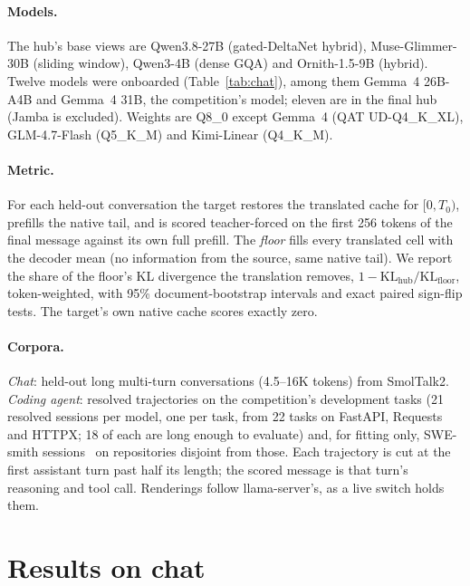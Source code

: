 \documentclass[11pt]{article}
\begin{document}
\paragraph{Models.} The hub's base views are Qwen3.8-27B (gated-DeltaNet hybrid), Muse-Glimmer-30B
(sliding window), Qwen3-4B (dense GQA) and Ornith-1.5-9B (hybrid). Twelve models were onboarded
(Table~\ref{tab:chat}), among them Gemma~4 26B-A4B and Gemma~4 31B, the competition's model; eleven are
in the final hub (Jamba is excluded). Weights are Q8\_0 except Gemma~4 (QAT UD-Q4\_K\_XL), GLM-4.7-Flash
(Q5\_K\_M) and Kimi-Linear (Q4\_K\_M).

\paragraph{Metric.} For each held-out conversation the target restores the translated cache for
$[0,T_0)$, prefills the native tail, and is scored teacher-forced on the first 256 tokens of the
final message against its own full prefill. The \emph{floor} fills every translated cell with the
decoder mean (no information from the source, same native tail). We report the share of the
floor's KL divergence the translation removes, $1 - \mathrm{KL}_{\text{hub}}/\mathrm{KL}_{\text{floor}}$,
token-weighted, with 95\% document-bootstrap intervals and exact paired sign-flip tests. The target's own native cache scores exactly zero.

\paragraph{Corpora.} \emph{Chat}: held-out long multi-turn conversations (4.5--16K tokens) from
SmolTalk2. \emph{Coding agent}: resolved trajectories on the competition's development tasks
(21 resolved sessions per model, one per task, from 22 tasks on FastAPI, Requests and HTTPX; 18 of each are
long enough to evaluate) and, for fitting only, SWE-smith sessions~\citep{yang2025swesmith} on repositories disjoint
from those. Each trajectory is cut at the first
assistant turn past half its length; the scored message is that turn's reasoning and tool call.
Renderings follow llama-server's, as a live switch holds them.

\section{Results on chat}\label{sec:chat}
\end{document}
